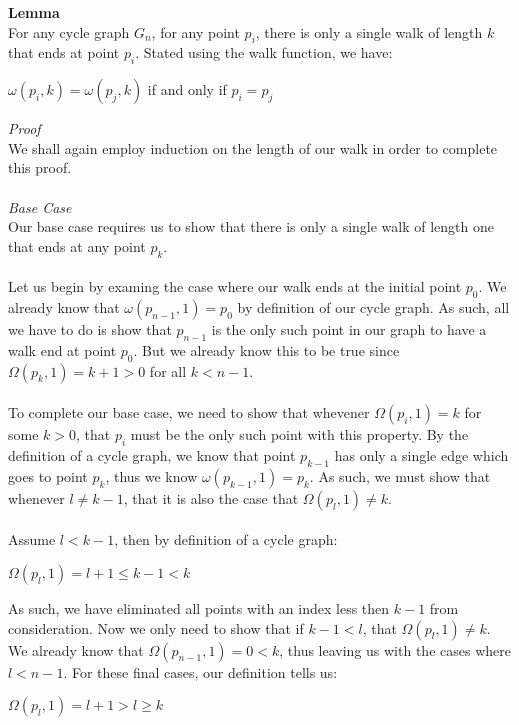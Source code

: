\documentclass[a4paper,12pt]{article}
\begin{document}
\begin{tcolorbox}
\textbf{Lemma}\\
For any cycle graph $G_n$, for any point $p_i$, there is only a single walk of length $k$ that ends at point $p_i$. Stated using the walk function, we have: 
\begin{center}
$\omega(p_i, k) = \omega(p_j, k)$ if and only if $p_i = p_j$
\end{center}
\end{tcolorbox}
\noindent
\textit{Proof}\\
We shall again employ induction on the length of our walk in order to complete this proof.\\
\\
\textit{Base Case}\\ 
Our base case requires us to show that there is only a single walk of length one that ends at any point $p_k$.\\
\\
Let us begin by examing the case where our walk ends at the initial point $p_0$. We already know that $\omega(p_{n-1}, 1) = p_0$ by definition of our cycle graph. As such, all we have to do is show that $p_{n-1}$ is the only such point in our graph to have a walk end at point $p_0$. But we already know this to be true since $\Omega(p_k, 1) = k + 1 > 0$ for all $k < n - 1$.\\
\\
To complete our base case, we need to show that whevener $\Omega(p_i, 1) = k$ for some $k > 0$, that $p_i$ must be the only such point with this property. By the definition of a cycle graph, we know that point $p_{k-1}$ has only a single edge which goes to point $p_k$, thus we know $\omega(p_{k-1}, 1) = p_k$. As such, we must show that whenever $l \neq k - 1$, that it is also the case that $\Omega(p_l, 1) \neq k$.\\
\\
Assume $l < k - 1$, then by definition of a cycle graph:
\begin{center}
$\Omega(p_l, 1) = l + 1 \leq k - 1 < k$
\end{center}
As such, we have eliminated all points with an index less then $k - 1$ from consideration. Now we only need to show that if $k - 1 < l$, that $\Omega(p_l, 1) \neq k$. We already know that $\Omega(p_{n-1}, 1) = 0 < k$, thus leaving us with the cases where $l < n - 1$. For these final cases, our definition tells us:
\begin{center}
$\Omega(p_l, 1) = l + 1 > l \geq k$
\end{center}
\end{document}

